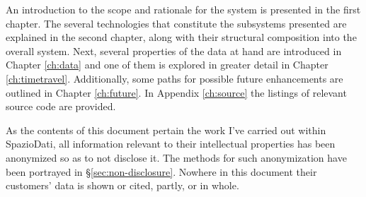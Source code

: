 An introduction to the scope and rationale for the system is presented in the first chapter.
The several technologies that constitute the subsystems presented are explained in the second chapter, along with their structural composition into the overall system.
Next, several properties of the data at hand are introduced in Chapter \ref{ch:data} and one of them is explored in greater detail in Chapter \ref{ch:timetravel}.
Additionally, some paths for possible future enhancements are outlined in Chapter \ref{ch:future}.
In Appendix \ref{ch:source} the listings of relevant source code are provided.

As the contents of this document pertain the work I've carried out within SpazioDati, all information relevant to their intellectual properties has been anonymized so as to not disclose it.
The methods for such anonymization have been portrayed in \S \ref{sec:non-disclosure}.
Nowhere in this document their customers' data is shown or cited, partly, or in whole.
